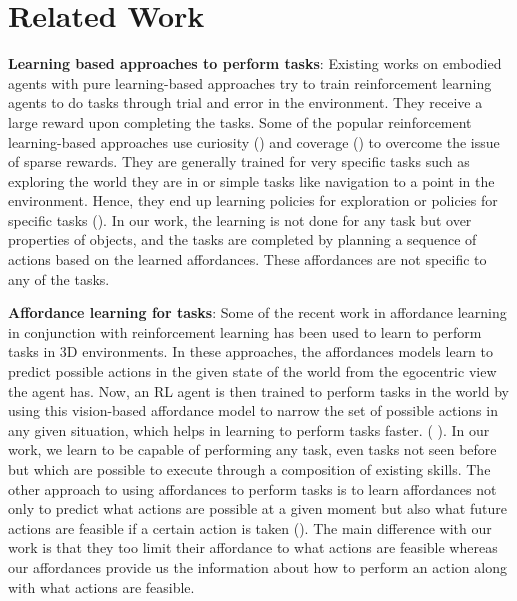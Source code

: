 \section{Related Work}
\label{related_work}

\textbf{Learning based approaches to perform tasks}: Existing works on embodied agents with pure learning-based approaches try to train reinforcement learning agents to do tasks through trial and error in the environment. They receive a large reward upon completing the tasks. Some of the popular reinforcement learning-based approaches use curiosity (\cite{curiosity_driven_exploration}) and coverage (\cite{Learning_Exploration_policies_for_Navigation}) to overcome the issue of sparse rewards. They are generally trained for very specific tasks such as exploring the world they are in or simple tasks like navigation to a point in the environment. Hence, they end up learning policies for exploration \cite{Learning_Exploration_policies_for_Navigation} or policies for specific tasks (\cite{Cognitive_Mapping_and_Planning_for_Visual_Navigation}). In our work, the learning is not done for any task but over properties of objects, and the tasks are completed by planning a sequence of actions based on the learned affordances. These affordances are not specific to any of the tasks.


\textbf{Affordance learning for tasks}: Some of the recent work in affordance learning in conjunction with reinforcement learning has been used to learn to perform tasks in 3D environments. In these approaches, the affordances models learn to predict possible actions in the given state of the world from the egocentric view the agent has. Now, an RL agent is then trained to perform tasks in the world by using this vision-based affordance model to narrow the set of possible actions in any given situation, which helps in learning to perform tasks faster.
( \cite{Learning_Affordance_Landscapes_Interaction_Exploration} \cite{Learning_About_Objects_by_Learning_to_Interact}). In our work, we learn to be capable of performing any task, even tasks not seen before but which are possible to execute through a composition of existing skills. The other approach to using affordances to perform tasks is to learn affordances not only to predict what actions are possible at a given moment but also what future actions are feasible if a certain action is taken (\cite{deep_affordance_foresight}). The main difference with our work is that they too limit their affordance to what actions are feasible whereas our affordances provide us the information about how to perform an action along with what actions are feasible. 


